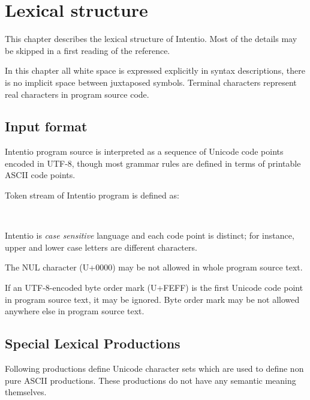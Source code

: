 \chapter{Lexical structure}

This chapter describes the lexical structure of Intentio. Most of the details may be skipped in a first reading of the reference.

In this chapter all white space is expressed explicitly in syntax descriptions, there is no implicit space between juxtaposed symbols. Terminal characters represent real characters in program source code.

\section{Input format}

Intentio program source is interpreted as a sequence of Unicode code points encoded in UTF-8, though most grammar rules are defined in terms of printable ASCII code points.

Token stream of Intentio program is defined as:

\begin{bnf}
   \eq {} \  \\
        \eq  {}
                  \gor {}
                  \gor {}
                  \gor {}
\end{bnf}

Intentio is \emph{case sensitive} language and each code point is distinct; for instance, upper and lower case letters are different characters.

The NUL character (U+0000) may be not allowed in whole program source text.

If an UTF-8-encoded byte order mark (U+FEFF) is the first Unicode code point in program source text, it may be ignored. Byte order mark may be not allowed anywhere else in program source text.

\section{Special Lexical Productions}

Following productions define Unicode character sets which are used to define non pure ASCII productions. These productions do not have any semantic meaning themselves.

